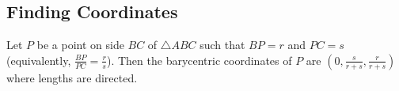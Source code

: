 \documentclass[11pt]{scrartcl}
\begin{document}




\subsection{Finding Coordinates}

\begin{lemma}
  Let $P$ be a point on side $BC$ of $\triangle ABC$ such that $BP=r$ and $PC=s$ (equivalently, $\frac{BP}{PC}=\frac{r}{s}$). Then the barycentric coordinates of $P$ are $(0,\frac{s}{r+s},\frac{r}{r+s})$ where lengths are directed.
\end{lemma}
\end{document}

